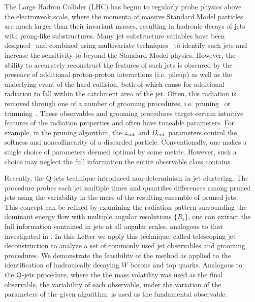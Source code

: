 \documentclass[aps,prl,floatfix,preprintnumbers,twocolumn,groupedaddress,nofootinbib]{revtex4-1}
\begin{document}
The Large Hadron Collider (LHC) has begun to regularly probe physics above the electroweak scale, where the momenta of massive Standard Model particles are much larger than their invariant masses, resulting in hadronic decays of jets with prong-like substructures. Many jet substructure variables have been designed~\cite{Abdesselam:2010pt,Altheimer:2012mn,Altheimer:2013yza} and combined using multivariate techniques~\cite{Adams:2015hiv,Larkoski:2017jix,ATLAS-CONF-2017-064,Khachatryan:1955546} to identify such jets and increase the sensitivity to beyond the Standard Model physics. However, the ability to accurately reconstruct the features of such jets is obscured by the presence of additional proton-proton interactions (i.e. pileup) as well as the underlying event of the hard collision, both of which cause for additional radiation to fall within the catchment area of the jet.  Often, this radiation is removed through one of a number of grooming procedures, i.e. pruning~\cite{Ellis:2009su} or trimming~\cite{Krohn:2009th}.  These observables and grooming procedures target certain intuitive features of the radiation properties and often have tuneable parameters.  For example, in the pruning algorithm, the $z_{\rm cut}$ and $D_{\rm cut}$ parameters control the softness and noncollinearity of a discarded particle. Conventionally, one makes a single choice of parameters deemed optimal by some metric.  However, such a choice may neglect the full information the entire observable class contains.

Recently, the Q-jets technique \cite{Ellis:2012sn} introduced non-determinism in jet clustering. The procedure probes each jet multiple times and quantifies differences among pruned jets using the variability in the mass of the resulting ensemble of pruned jets. This concept can be refined by examining the radiation pattern surrounding the dominant energy flow with multiple angular resolutions $\{R_i\}$, one can extract the full information contained in jets at all angular scales, analogous to that investigated in \cite{Chien:2014hla}. In this Letter we apply this technique, called telescoping jet deconstruction to analyze a set of commonly used jet observables and grooming procedures. We demonstrate the feasibility of the method as applied to the identification of hadronically decaying $W$ bosons and top quarks. Analogous to the Q-jets procedure, where the the mass volatility was used as the final observable, the variability of each observable, under the variation of the parameters of the given algorithm, is used as the fundamental observable.
\end{document}
